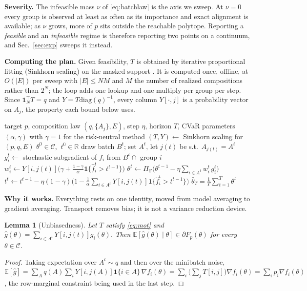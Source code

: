 \documentclass{article}
\newtheorem{lemma}[theorem]{Lemma}
\theoremstyle{definition}
\newcommand{\R}{\mathbb{R}}
\newcommand{\E}{\mathbb{E}}
\newcommand{\Proj}{\Pi_{\mathcal{C}}}
\newcommand{\avot}{\textsf{GAVOT}}
\begin{document}
\noindent\textbf{Severity.}
The infeasible mass $\nu$ of \eqref{eq:batchlaw} is the axis we sweep. At
$\nu=0$ every group is observed at least as often as its importance and exact
alignment is available; as $\nu$ grows, more of $p$ sits outside the reachable
polytope. Reporting a \emph{feasible} and an \emph{infeasible} regime is
therefore reporting two points on a continuum, and Sec.~\ref{sec:exp} sweeps it
instead.

\noindent\textbf{Computing the plan.}
Given feasibility, $T$ is obtained by iterative proportional fitting (Sinkhorn
scaling) on the masked support \cite{sinkhorn1967,cuturi2013,peyre2019}. It is
computed once, offline, at $O(|E|)$ per sweep with $|E|\le NM$ and $M$ the
number of realized compositions rather than $2^N$; the loop adds one lookup and
one multiply per group per step. Since $\mathbf{1}_N^\top T=q$ and
$Y=T\mathrm{diag}(q)^{-1}$, every column $Y[\cdot,j]$ is a probability vector on
$A_j$, the property each bound below uses.

\begin{algorithm}[t]
\caption{\avot{}: group-fair SGD by masked transport}
\label{alg:gavot}
\begin{algorithmic}[1]
\Require target $p$, composition law $(q,\{A_j\},E)$, step $\eta$, horizon $T$,
 CVaR parameters $(\alpha,\gamma)$ with $\gamma=1$ for the risk-neutral method
\State $(T,Y)\leftarrow$ Sinkhorn scaling for $(p,q,E)$ 
\State $\theta^0\in\mathcal{C}$, $\ t^0\in\R$
  \State draw batch $B^t$; set $A^t$, let $j(t)$ be s.t.\ $A_{j(t)}=A^t$
  \State $g^t_i \leftarrow$ stochastic subgradient of $f_i$ from $B^t\cap$ group $i$
  \State $w^t_i \leftarrow Y[i,j(t)]\big(\gamma+\tfrac{1-\gamma}{\alpha}\mathbf{1}\{\hat f^t_i>t^{t-1}\}\big)$
  \State $\theta^{t}\leftarrow\Proj\big(\theta^{t-1}-\eta\sum_{i\in A^t}w^t_i\,g^t_i\big)$
  \State $t^{t}\leftarrow t^{t-1}-\eta(1-\gamma)\big(1-\tfrac{1}{\alpha}\sum_{i\in A^t}Y[i,j(t)]\mathbf{1}\{\hat f^t_i>t^{t-1}\}\big)$
\EndFor
\Ensure $\bar\theta_T=\frac{1}{T}\sum_{t=1}^{T}\theta^t$
\end{algorithmic}
\end{algorithm}

\noindent\textbf{Why it works.}
Everything rests on one identity, \cite[Lem.~1]{rahimi2025fedavot} moved from
model averaging to gradient averaging. Transport removes bias; it is not a
variance reduction device.

\begin{lemma}[Unbiasedness]
\label{lem:unbiased}
Let $T$ satisfy \eqref{eq:mot} and $\hat g(\theta)=\sum_{i\in A^t}Y[i,j(t)]g_i(\theta)$.
Then $\E[\hat g(\theta)\mid\theta]\in\partial F_p(\theta)$ for every
$\theta\in\mathcal{C}$.
\end{lemma}
\begin{proof}
Taking expectation over $A^t\sim q$ and then over the minibatch noise,
$\E[\hat g]=\sum_{A}q(A)\sum_i Y[i,j(A)]\mathbf{1}\{i\in A\}\,\nabla f_i(\theta)
=\sum_i\big(\sum_j T[i,j]\big)\nabla f_i(\theta)=\sum_i p_i\nabla f_i(\theta)$,
the row-marginal constraint being used in the last step.
\end{proof}
\end{document}
